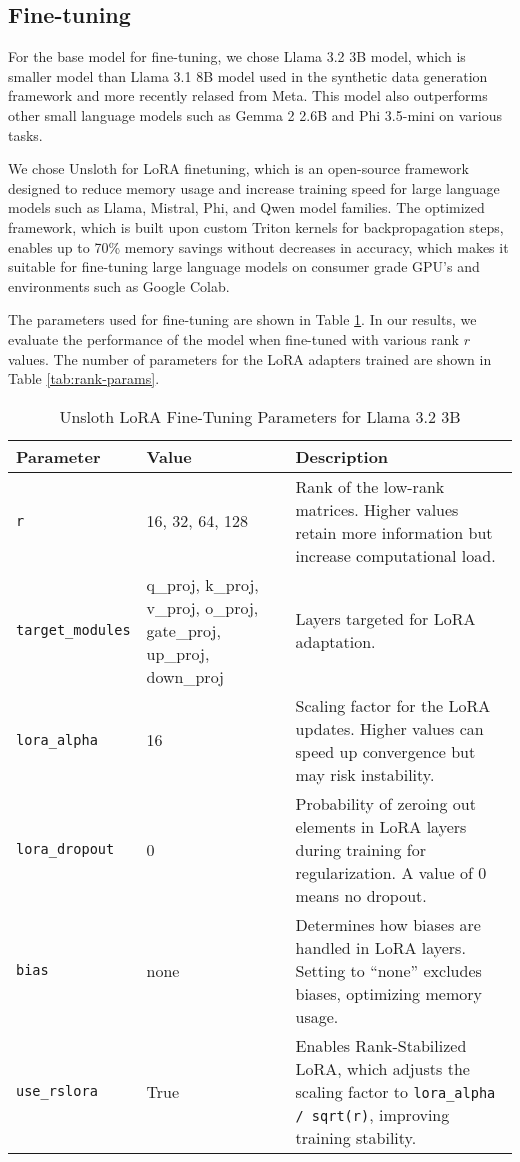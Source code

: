 \subsection{Fine-tuning}


For the base model for fine-tuning, we chose Llama 3.2 3B model, which is smaller model than Llama 3.1 8B model used in the synthetic data generation framework and more 
recently relased from Meta. This model also outperforms other small language models such as Gemma 2 2.6B and Phi 3.5-mini on various tasks.

We chose Unsloth for LoRA finetuning, which is an open-source framework designed to reduce memory usage and increase training speed for large language models such as Llama, Mistral, 
Phi, and Qwen model families. The optimized framework, which is built upon custom Triton kernels for backpropagation steps, enables up to 70\% memory savings without decreases in 
accuracy, which makes it suitable for fine-tuning large language models on consumer grade GPU's and environments such as Google Colab. 

The parameters used for fine-tuning are shown in Table \ref{tab:lora-parameters}. In our results, we evaluate the performance of the model when fine-tuned with various rank $\mathit{r}$ values.
The number of parameters for the LoRA adapters trained are shown in Table \ref{tab:rank-params}.


\begin{table}[t]
    \centering
    \caption{Unsloth LoRA Fine-Tuning Parameters for Llama 3.2 3B}
    \label{tab:lora-parameters}
    \begin{tabular}{l p{2cm} p{8.2cm}}
    \toprule
    \textbf{Parameter} & \textbf{Value} & \textbf{Description} \\
    \midrule
    \texttt{r} & 16, 32, 64, 128 & Rank of the low-rank matrices. Higher values retain more information but increase computational load. \\
    \addlinespace[3pt]
    \texttt{target\_modules} & q\_proj, k\_proj, v\_proj, o\_proj, gate\_proj, up\_proj, down\_proj & 
    Layers targeted for LoRA adaptation. \\
    \addlinespace[3pt]
    \texttt{lora\_alpha} & 16 & Scaling factor for the LoRA updates. Higher values can speed up convergence but may risk instability. \\
    \addlinespace[3pt]
    \texttt{lora\_dropout} & 0 & Probability of zeroing out elements in LoRA layers during training for regularization. A value of 0 means no dropout. \\
    \addlinespace[3pt]
    \texttt{bias} & none & Determines how biases are handled in LoRA layers. Setting to ``none'' excludes biases, optimizing memory usage. \\
    \addlinespace[3pt]
    \texttt{use\_rslora} & True & Enables Rank-Stabilized LoRA, which adjusts the scaling factor to \texttt{lora\_alpha / sqrt(r)}, improving training stability. \\
    \bottomrule
    \end{tabular}
 \end{table}

